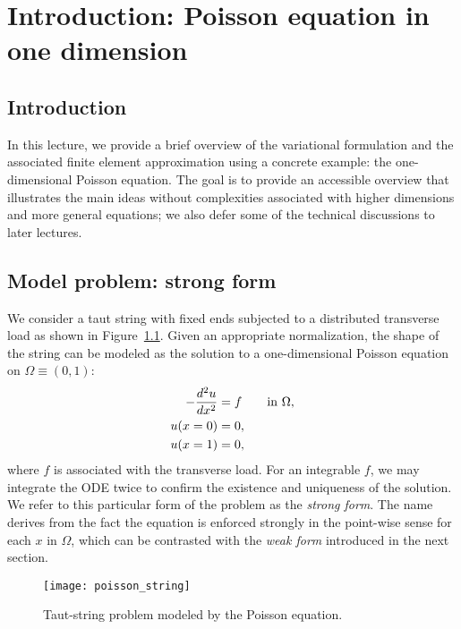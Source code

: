 \chapter{Introduction: Poisson equation in one dimension}
\label{ch:pos1d}

\disclaimer

\section{Introduction}
In this lecture, we provide a brief overview of the variational formulation and the associated finite element approximation using a concrete example: the one-dimensional Poisson equation. The goal is to provide an accessible overview that illustrates the main ideas without complexities associated with higher dimensions and more general equations; we also defer some of the technical discussions to later lectures.

\section{Model problem: strong form}
\label{sec:pos1d_strong}
We consider a taut string with fixed ends subjected to a distributed transverse load as shown in Figure~\ref{fig:pos1d_string}.  Given an appropriate normalization, the shape of the string can be modeled as the solution to a one-dimensional Poisson equation on $\Omega \equiv (0,1)$: %
\begin{align}
  - \frac{d ^2u}{d x^2} &= f \qquad \text{in } \Omega,  \label{eq:pos1d_strong} \\
  u(x=0) &= 0 \notag , \\
  u(x=1) &= 0 \notag ,
\end{align}
where $f$ is associated with the transverse load.  For an integrable $f$, we may integrate the ODE twice to confirm the existence and uniqueness of the solution.  We refer to this particular form of the problem as the \emph{strong form}.  The name derives from the fact the equation is enforced strongly in the point-wise sense for each $x$ in $\Omega$, which can be contrasted with the \emph{weak form} introduced in the next section. %

\begin{figure}
  \centering
  \texttt{[image: poisson\_string]}
  \caption{Taut-string problem modeled by the Poisson equation. \label{fig:pos1d_string}}
\end{figure}

